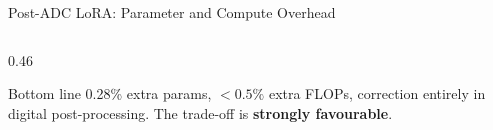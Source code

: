 \begin{frame}[shrink=20]{Post-ADC LoRA: Parameter and Compute Overhead}
\begin{columns}[T]
\begin{column}{0.46\textwidth}
      \vspace{0.15em}
      \vspace{0.15em}
      \begin{exampleblock}{Bottom line}
        \small 0.28\% extra params, $<0.5\%$ extra FLOPs,
        correction entirely in digital post-processing.
        The trade-off is \textbf{strongly favourable}.
      \end{exampleblock}
    \end{column}
  \end{columns}
\end{frame}
